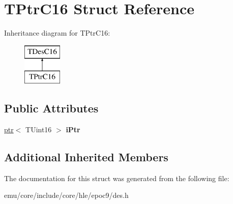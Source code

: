 \hypertarget{struct_t_ptr_c16}{}\section{T\+Ptr\+C16 Struct Reference}
\label{struct_t_ptr_c16}
Inheritance diagram for T\+Ptr\+C16\+:\begin{figure}[H]
\begin{center}
\leavevmode
\includegraphics[height=2.000000cm]{struct_t_ptr_c16}
\end{center}
\end{figure}
\subsection*{Public Attributes}
\begin{DoxyCompactItemize}
\item 
\mbox{\label{struct_t_ptr_c16_a8243acea027cb7ea16e9300093a88616}} 
\mbox{\hyperlink{classeka2l1_1_1ptr}{ptr}}$<$ T\+Uint16 $>$ {\bfseries i\+Ptr}
\end{DoxyCompactItemize}
\subsection*{Additional Inherited Members}


The documentation for this struct was generated from the following file\+:\begin{DoxyCompactItemize}
\item 
emu/core/include/core/hle/epoc9/des.\+h\end{DoxyCompactItemize}
